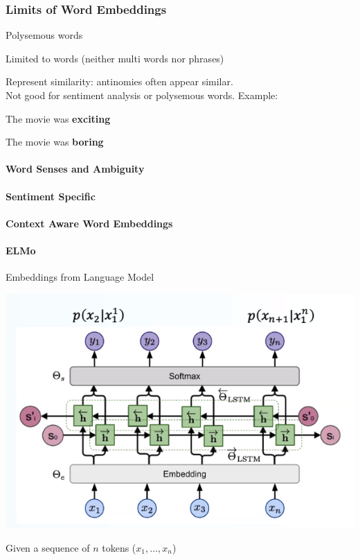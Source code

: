 \documentclass[10pt]{report}
\begin{document}
\subsubsection{Limits of Word Embeddings} \begin{list}{}{}
	\item Polysemous words
	\item Limited to words (neither multi words nor phrases)
	\item Represent similarity: antinomies often appear similar.\\
	Not good for sentiment analysis or polysemous words. Example:
	\begin{list}{}{}
		\item The movie was \textbf{exciting}
		\item The movie was \textbf{boring}
	\end{list}
\end{list}
\paragraph{Word Senses and Ambiguity}
\paragraph{Sentiment Specific}
\paragraph{Context Aware Word Embeddings}
\paragraph{ELMo} Embeddings from Language Model
\begin{center}
	\includegraphics[scale=0.5]{8.png}
\end{center}
Given a sequence of $n$ tokens ($x_1,\ldots,x_n$) %
\end{document}
